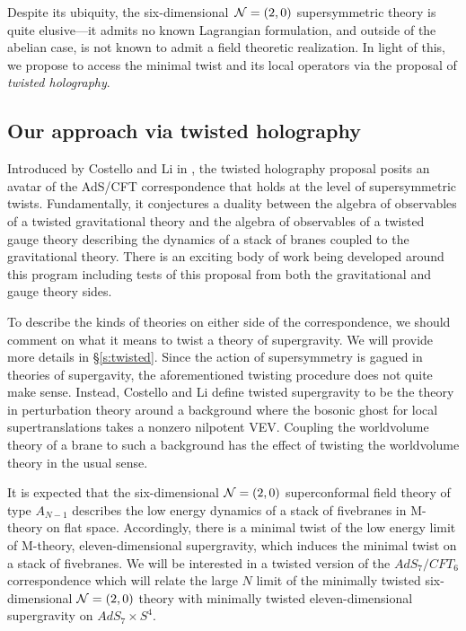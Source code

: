 

Despite its ubiquity, the six-dimensional~$\mathcal N=(2,0)$ supersymmetric theory is quite elusive---it admits no known Lagrangian formulation, and outside of the abelian case, is not known to admit a field theoretic realization.
In light of this, we propose to access the minimal twist and its local operators via the proposal of \textit{twisted holography}.

\subsection{Our approach via twisted holography}
Introduced by Costello and Li in \cite{CLsugra}, the twisted holography proposal posits an avatar of the AdS/CFT correspondence that holds at the level of supersymmetric twists.
Fundamentally, it conjectures a duality between the algebra of observables of a twisted gravitational theory and the algebra of observables of a twisted gauge theory describing the dynamics of a stack of branes coupled to the gravitational theory. There is an exciting body of work being developed around this program including tests of this proposal from both the gravitational and gauge theory sides.

To describe the kinds of theories on either side of the correspondence, we should comment on what it means to twist a theory of supergravity. We will provide more details in \S \ref{s:twisted}. Since the action of supersymmetry is gagued in theories of supergavity, the aforementioned twisting procedure does not quite make sense. Instead, Costello and Li define twisted supergravity to be the theory in perturbation theory around a background where the bosonic ghost for local supertranslations takes a nonzero nilpotent VEV. Coupling the worldvolume theory of a brane to such a background has the effect of twisting the worldvolume theory in the usual sense.

It is expected that the six-dimensional $\mathcal N=(2,0)$ superconformal field theory of type $A_{N-1}$ describes the low energy dynamics of a stack of fivebranes in M-theory on flat space. Accordingly, there is a minimal twist of the low energy limit of M-theory, eleven-dimensional supergravity, which induces the minimal twist on a stack of fivebranes. We will be interested in a twisted version of the $AdS_{7}/CFT_{6}$ correspondence which will relate the large $N$ limit of the minimally twisted six-dimensional $\mathcal N=(2,0)$ theory with minimally twisted eleven-dimensional supergravity on $AdS_{7}\times S^{4}$.

